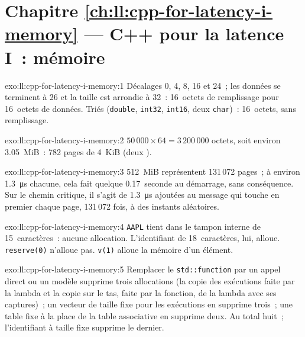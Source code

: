 \section*{Chapitre \ref{ch:ll:cpp-for-latency-i-memory} --- C++ pour la latence I~: mémoire}

\begin{solution}{exo:ll:cpp-for-latency-i-memory:1}
Décalages 0, 4, 8, 16 et 24~; les données se terminent à 26 et la taille est arrondie à 32~: 16~octets de remplissage pour 16~octets de données. Triés
(\texttt{double}, \texttt{int32}, \texttt{int16}, deux \texttt{char})~: 16~octets, sans remplissage.
\end{solution}

\begin{solution}{exo:ll:cpp-for-latency-i-memory:2}
$50\,000 \times 64 = 3\,200\,000$ octets, soit environ 3.05~MiB~: 782 pages de 4~KiB (deux ).
\end{solution}

\begin{solution}{exo:ll:cpp-for-latency-i-memory:3}
512~MiB représentent 131\,072 pages~; à environ \qty{1.3}{\micro\second} chacune, cela fait quelque 0.17~seconde au démarrage, sans conséquence. Sur le
chemin critique, il s'agit de \qty{1.3}{\micro\second} ajoutées au message qui touche en premier chaque page, 131\,072 fois, à des instants aléatoires.
\end{solution}

\begin{solution}{exo:ll:cpp-for-latency-i-memory:4}
\texttt{\textquotedbl{}AAPL\textquotedbl{}} tient dans le tampon interne de 15~caractères~: aucune allocation. L'identifiant de 18~caractères, lui, alloue.
\texttt{reserve(0)} n'alloue pas. \texttt{v(1)} alloue la mémoire d'un élément.
\end{solution}

\begin{solution}{exo:ll:cpp-for-latency-i-memory:5}
Remplacer le \texttt{std::function} par un appel direct ou un modèle supprime trois allocations (la copie des exécutions faite par la lambda et
la copie sur le tas, faite par la fonction, de la lambda avec ses captures)~; un vecteur de taille fixe pour les exécutions en supprime trois~; une table fixe à la place de
la table associative en supprime deux. Au total huit~; l'identifiant à taille fixe supprime le dernier.
\end{solution}

